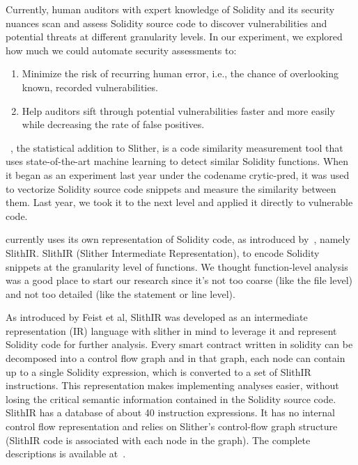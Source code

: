 Currently, human auditors with expert knowledge of Solidity and its security nuances scan and assess Solidity source code to discover vulnerabilities and potential threats at different granularity levels.
In our experiment, we explored how much we could automate security assessments to:
\begin{enumerate}
  \item Minimize the risk of recurring human error, i.e., the chance of overlooking known, recorded vulnerabilities.
  \item Help auditors sift through potential vulnerabilities faster and more easily while decreasing the rate of false positives.
\end{enumerate}

\slithersimil~\cite{slithersimil}, the statistical addition to Slither, is a code similarity measurement tool that uses state-of-the-art machine learning to detect similar Solidity functions.
When it began as an experiment last year under the codename crytic-pred, it was used to vectorize Solidity source code snippets and measure the similarity between them.
Last year, we took it to the next level and applied it directly to vulnerable code.

\slithersimil currently uses its own representation of Solidity code, as introduced by~\cite{slither}, namely SlithIR.
SlithIR (Slither Intermediate Representation), to encode Solidity snippets at the granularity level of functions.
We thought function-level analysis was a good place to start our research since
it's not too coarse (like the file level) and not too detailed (like the statement or line level).

As introduced by Feist et al, SlithIR was developed as an intermediate representation (IR) language with slither in mind to leverage it and represent Solidity code for further analysis.
Every smart contract written in solidity can be decomposed into a control flow graph and in that graph, each node can contain up to a single Solidity expression, which is converted to a set of SlithIR instructions.
This representation makes implementing analyses easier, without losing the critical semantic information contained in the Solidity source code.~\cite{slither}
SlithIR has a database of about 40 instruction expressions.
It has no internal control flow representation and relies on Slither's control-flow graph structure (SlithIR code is associated with each node in the graph).
The complete descriptions is available at~\cite{slithir}.

